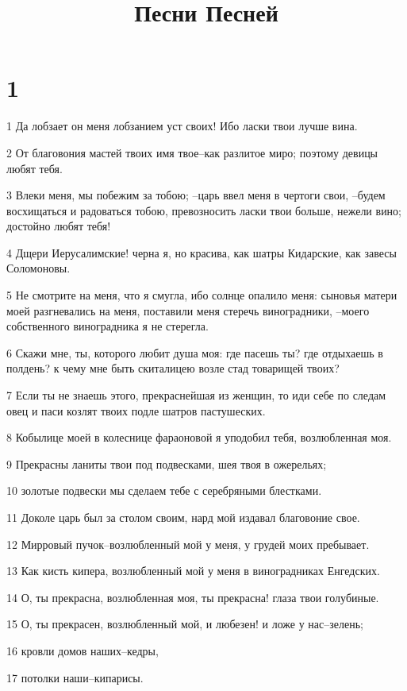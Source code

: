 

\title{Песни Песней}


\chapter{1}

\par 1 Да лобзает он меня лобзанием уст своих! Ибо ласки твои лучше вина.
\par 2 От благовония мастей твоих имя твое--как разлитое миро; поэтому девицы любят тебя.
\par 3 Влеки меня, мы побежим за тобою; --царь ввел меня в чертоги свои, --будем восхищаться и радоваться тобою, превозносить ласки твои больше, нежели вино; достойно любят тебя!
\par 4 Дщери Иерусалимские! черна я, но красива, как шатры Кидарские, как завесы Соломоновы.
\par 5 Не смотрите на меня, что я смугла, ибо солнце опалило меня: сыновья матери моей разгневались на меня, поставили меня стеречь виноградники, --моего собственного виноградника я не стерегла.
\par 6 Скажи мне, ты, которого любит душа моя: где пасешь ты? где отдыхаешь в полдень? к чему мне быть скиталицею возле стад товарищей твоих?
\par 7 Если ты не знаешь этого, прекраснейшая из женщин, то иди себе по следам овец и паси козлят твоих подле шатров пастушеских.
\par 8 Кобылице моей в колеснице фараоновой я уподобил тебя, возлюбленная моя.
\par 9 Прекрасны ланиты твои под подвесками, шея твоя в ожерельях;
\par 10 золотые подвески мы сделаем тебе с серебряными блестками.
\par 11 Доколе царь был за столом своим, нард мой издавал благовоние свое.
\par 12 Мирровый пучок--возлюбленный мой у меня, у грудей моих пребывает.
\par 13 Как кисть кипера, возлюбленный мой у меня в виноградниках Енгедских.
\par 14 О, ты прекрасна, возлюбленная моя, ты прекрасна! глаза твои голубиные.
\par 15 О, ты прекрасен, возлюбленный мой, и любезен! и ложе у нас--зелень;
\par 16 кровли домов наших--кедры,
\par 17 потолки наши--кипарисы.

